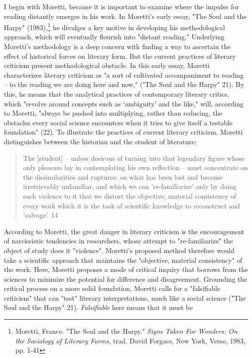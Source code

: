 \documentclass[11pt]{article}
\begin{document}
I begin with Moretti, because it is important to examine where the
impulse for reading distantly emerges in his work. In Moretti's early
essay, "The Soul and the Harpy" (1983),\footnote{Moretti, Franco. "The Soul and the Harpy." \emph{Signs Taken For
Wonders: On the Sociology of Literary Forms}, trad. David Forgacs, New
York, Verso, 1983, pp. 1-41} he divulges a key motive
in developing his methodological approach, which will eventually
flourish into "distant reading." Underlying Moretti’s methodology is a
deep concern with finding a way to ascertain the effect of historical
forces on literary form. But the current practices of literary
criticism present methodological obstacle. In this early essay,
Moretti characterizes literary criticism as "a sort of cultivated
accompaniment to reading – to the reading we are doing here and now,"
("The Soul and the Harpy" 21). By this, he means that the analytical
practices of contemporary literary critics, which "revolve around
concepts such as ‘ambiguity’ and the like," will, according to
Moretti, "always be pushed into multiplying, rather than reducing, the
obstacles every social science encounters when it tries to give itself
a testable foundation" (22). To illustrate the practices of current
literary criticism, Moretti distinguishes between the historian and
the student of literature:
\begin{quote}
The [student] – unless desirous of turning into that legendary figure
whose only pleasure lay in contemplating his own reflection – must
concentrate on the dissimilarities and ruptures: on what has been lost
and become irretrievably unfamiliar, and which we can 're-familiarize'
only by doing such violence to it that we distort the objective,
material consistency of every work which it is the task of scientific
knowledge to reconstruct and 'salvage'. 14
\end{quote}
According to Moretti, the great danger in literary criticism is the
encouragement of narcissistic tendencies in researchers, whose attempt
to "re-familiarize" the object of study does it "violence". Moretti's
proposed method therefore would take a scientific approach that
maintains the "objective, material consistency" of the work. Here,
Moretti proposes a mode of critical inquiry that borrows from the
sciences to minimize the potential for difference and
disagreement. Grounding the critical process on a more solid
foundation, Moretti calls for a "falsifiable criticism" that can
"test" literary interpretations, much like a social science ("The Soul
and the Harpy" 21). \emph{Falsifiable} here means that it must be
\end{document}
